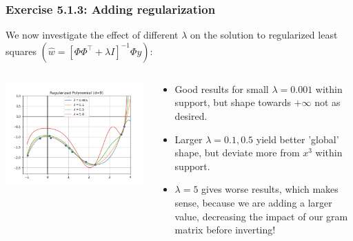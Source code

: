 \documentclass[10pt,aspectratio=169,handout]{beamer}
\begin{document}
\begin{frame}
    \frametitle{Exercise 5.1.3: Adding regularization}

    We now investigate the effect of different $\lambda$ on the solution to regularized least squares $(\hat{w}=[\Phi\Phi^\intercal+\lambda I]^{-1}\Phi y)$: \newline
    \begin{columns}
    \begin{column}{0.4\textwidth}
        \includegraphics[width=\textwidth]{images/task-5-1-3.png}
    \end{column}
    \begin{column}{0.6\textwidth}
        \begin{itemize}
            \item Good results for small $\lambda=0.001$ within support, but shape towards $+\infty$ not as desired.
            \item Larger $\lambda=0.1, 0.5$ yield better 'global' shape, but deviate more from $x^3$ within support.  
            \item $\lambda=5$ gives worse results, which makes sense, because we are adding a larger value, decreasing the impact of our gram matrix before inverting!
        \end{itemize}
    \end{column}
    \end{columns}
    
\end{frame}
\end{document}

